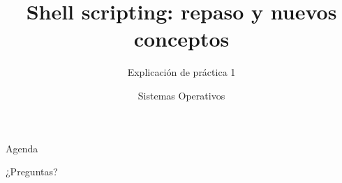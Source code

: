 


\title{Shell scripting: repaso y nuevos conceptos}
\author{Sistemas Operativos}
\subtitle{Explicación de práctica 1}



\begin{frame}
  \titlepage
\end{frame}

\begin{frame}{Agenda}
  \tableofcontents
\end{frame}





\begin{frame}{}
  \begin{center}
    \vfill
    \huge ¿Preguntas?
    \vfill
  \end{center}
\end{frame}


